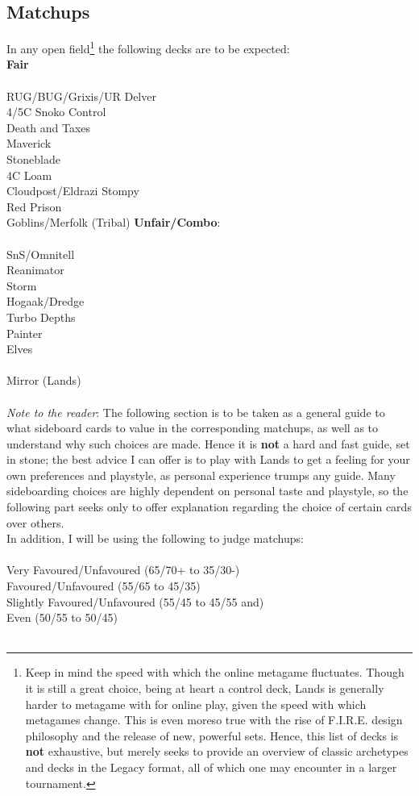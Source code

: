 \documentclass{report}
\begin{document}
\subsection{Matchups}
In any open field\footnote{Keep in mind the speed with which the online metagame fluctuates. Though it is still a great choice, being at heart a control deck, Lands is generally harder to metagame with for online play, given the speed with which metagames change. This is even moreso true with the rise of F.I.R.E. design philosophy and the release of new, powerful sets. Hence, this list of decks is \textbf{not} exhaustive, but merely seeks to provide an overview of classic archetypes and decks in the Legacy format, all of which one may encounter in a larger tournament.} the following decks are to be expected:\\
\textbf{Fair}\\\\
RUG/BUG/Grixis/UR Delver\\
4/5C Snoko Control\\
Death and Taxes\\
Maverick\\
Stoneblade\\
4C Loam\\
Cloudpost/Eldrazi Stompy\\
Red Prison\\
Goblins/Merfolk (Tribal)
\newpage
\textbf{Unfair/Combo}:\\\\
SnS/Omnitell\\
Reanimator\\
Storm\\
Hogaak/Dredge\\
Turbo Depths\\
Painter\\
Elves\\\\
Mirror (Lands)\\\\
\emph{Note to the reader}: The following section is to be taken as a general guide to what sideboard cards to value in the corresponding matchups, as well as to understand why such choices are made. Hence it is \textbf{not} a hard and fast guide, set in stone; the best advice I can offer is to play with Lands to get a feeling for your own preferences and playstyle, as personal experience trumps any guide. Many sideboarding choices are highly dependent on personal taste and playstyle, so the following part seeks only to offer explanation regarding the choice of certain cards over others.\\ In addition, I will be using the following to judge matchups:\\\\ Very Favoured/Unfavoured (65/70+ to 35/30-)\\ Favoured/Unfavoured (55/65 to 45/35)\\Slightly Favoured/Unfavoured (55/45 to 45/55 and)\\ Even (50/55 to 50/45)\\\\
\end{document}
